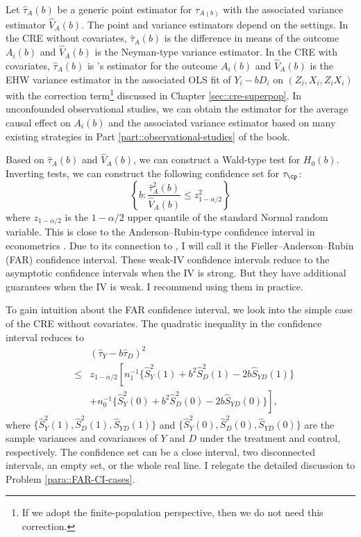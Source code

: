 Let $ \hat{\tau}_A(b)$ be a generic point estimator for $\tau_{A(b)} $ with the associated variance estimator $\hat{V}_A( b )$. The point and variance estimators depend on the settings. 
In the CRE without covariates, $ \hat{\tau}_A(b)$ is the difference in means of the outcome $A_i( b)$ and $\hat{V}_A( b )$ is the Neyman-type variance estimator. 
In the CRE with covariates, $ \hat{\tau}_A(b)$ is \citet{lin2013}'s estimator for the outcome $A_i( b)$ and $\hat{V}_A( b )$ is the EHW variance estimator in the associated OLS fit of $Y_i - b D_i$ on $(Z_i, X_i, Z_i X_i)$ with the correction term\footnote{If we adopt the finite-population perspective, then we do not need this correction.} discussed in Chapter \ref{sec::cre-superpop}. 
In unconfounded observational studies,  we can obtain the estimator for the average causal effect on $A_i( b)$ and the associated variance estimator based on many existing strategies in Part \ref{part::observational-studies} of the book.  


Based on $ \hat{\tau}_A(b)$ and $\hat{V}_A( b )$, we can construct a Wald-type test for $H_0(b)$. Inverting tests, we can construct the following confidence set for $\tau_\cp$:
$$
\left\{  b:    \frac{   \hat{\tau}_A^2(b)  }{  \hat{V}_A(b)  } \leq z_{1-\alpha/2}^2 \right\}
$$
where $z_{1-\alpha/2}$ is the $1-\alpha/2$ upper quantile of the standard Normal random variable. 
This is close to the Anderson--Rubin-type confidence interval in econometrics \citep{anderson1950asymptotic}.  Due to its connection to \citet{fieller1954some}, I will call it the Fieller--Anderson--Rubin (FAR) confidence interval. 
These weak-IV confidence intervals reduce to the asymptotic confidence intervals when the IV is strong. But they have additional guarantees when the IV is weak. I recommend using them in practice. 


\begin{example}\label{eg::FAR-CI-noX}
To gain intuition about the FAR confidence interval, we look into the simple case of the CRE without covariates. The quadratic inequality in the confidence interval reduces to 
\begin{eqnarray*}
&& (\hat{\tau}_Y  - b   \hat{\tau}_D)^2 \\ 
& \leq & z_{1-\alpha/2}
\left[      n_1^{-1} \{  \hat{S}_Y^2(1)  + b^2\hat{S}_D^2(1) - 2 b \hat{S}_{YD}(1)  \}  \right. \\
&& \left. 
 + n_0^{-1} \{  \hat{S}_Y^2(0)  + b^2\hat{S}_D^2(0) - 2 b \hat{S}_{YD}(0)  \}    \right] ,
\end{eqnarray*}
where $\{ \hat{S}_Y^2(1) ,  \hat{S}_D^2(1) , \hat{S}_{YD}(1)  \}$ and $ \{ \hat{S}_Y^2(0), \hat{S}_D^2(0),\hat{S}_{YD}(0) \} $ are the sample variances and covariances of $Y$ and $D$ under the treatment and control, respectively. 
The confidence set can be a close interval, two disconnected intervals, an empty set, or the whole real line. I relegate the detailed discussion to Problem \ref{para::FAR-CI-cases}. 
\end{example}
 



